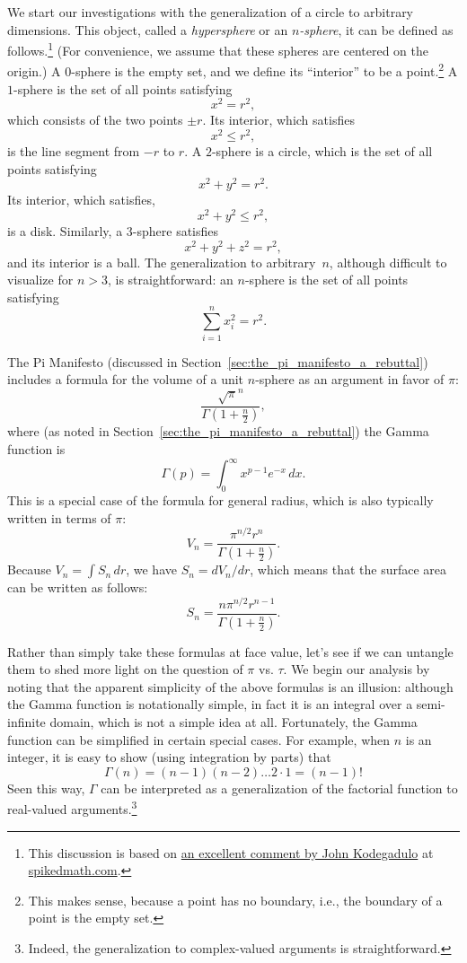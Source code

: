 We start our investigations with the generalization of a circle to arbitrary dimensions. This object, called a \emph{hypersphere} or an \emph{$n$-sphere}, it can be defined as follows.\footnote{This discussion is based on \href{http://spikedmath.com/forum/viewtopic.php?f=30&t=147\#p1577}{an excellent comment by John Kodegadulo} at \href{http://spikedmath.com/}{spikedmath.com}.} (For convenience, we assume that these spheres are centered on the origin.) A $0$-sphere is the empty set, and we define its ``interior'' to be a point.\footnote{This makes sense, because a point has no boundary, i.e., the boundary of a point is the empty set.} A $1$-sphere is the set of all points satisfying
\[
x^2 = r^2,
\]
which consists of the two points $\pm r$. Its interior, which satisfies
\[
x^2 \leq r^2,
\]
is the line segment from $-r$ to $r$. A $2$-sphere is a circle, which is the set of all points satisfying
\[
x^2 + y^2 = r^2.
\]
Its interior, which satisfies,
\[
x^2 + y^2 \leq r^2,
\]
is a disk. Similarly, a $3$-sphere satisfies
\[
x^2 + y^2 + z^2 = r^2,
\]
and its interior is a ball. The generalization to arbitrary~$n$, although difficult to visualize for $n > 3$, is straightforward: an $n$-sphere is the set of all points satisfying
\[
\sum_{i=1}^{n} x_i^2 = r^2.
\]

The Pi Manifesto (discussed in Section~\ref{sec:the_pi_manifesto_a_rebuttal}) includes a formula for the volume of a unit $n$-sphere as an argument in favor of $\pi$:
\[
\frac{\sqrt{\pi}^{n} }{\Gamma(1 + \frac{n}{2})},
\]
where (as noted in Section~\ref{sec:the_pi_manifesto_a_rebuttal}) the Gamma function is
\[ \Gamma(p) = \int_{0}^{\infty} x^{p-1} e^{-x}\,dx.
\]
This is a special case of the formula for general radius, which is also typically written in terms of $\pi$:
\[ V_n = \frac{\pi^{n/2} r^n}{\Gamma(1 + \frac{n}{2})}. \]
Because $V_n = \int S_n\,dr$, we have $S_n = dV_n/dr$, which means that the surface area can be written as follows:
\[ S_n = \frac{n \pi^{n/2} r^{n-1}}{\Gamma(1 + \frac{n}{2})}. \]

Rather than simply take these formulas at face value, let's see if we can untangle them to shed more light on the question of $\pi$ vs. $\tau$. We begin our analysis by noting that the apparent simplicity of the above formulas is an illusion: although the Gamma function is notationally simple, in fact it is an integral over a semi-infinite domain, which is not a simple idea at all. Fortunately, the Gamma function can be simplified in certain special cases. For example, when $n$ is an integer, it is easy to show (using integration by parts) that
\[
\Gamma(n) = (n-1)(n-2)\ldots 2\cdot 1 = (n-1)!
\]
Seen this way, $\Gamma$ can be interpreted as a generalization of the factorial function to real-valued arguments.\footnote{Indeed, the generalization to complex-valued arguments is straightforward.}

